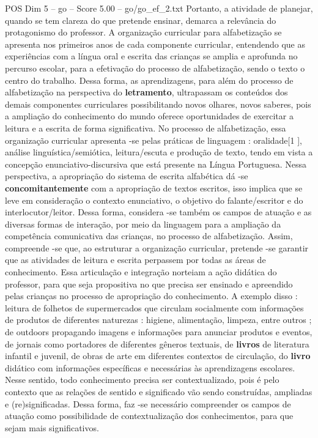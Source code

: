 \begin{textsample}{POS Dim 5 – go – Score 5.00 – go/go\_ef\_2.txt}
Portanto, a atividade de planejar, quando se tem clareza do que pretende ensinar, demarca a relevância do protagonismo do professor.
A organização curricular para alfabetização se apresenta nos primeiros anos de cada componente curricular, entendendo que as experiências com a língua oral e escrita das crianças se amplia e aprofunda no percurso escolar, para a efetivação do processo de alfabetização, sendo o texto o centro do trabalho.
Dessa forma, as aprendizagens, para além do processo de alfabetização na perspectiva do \textbf{letramento}, ultrapassam os conteúdos dos demais componentes curriculares possibilitando novos olhares, novos saberes, pois a ampliação do conhecimento do mundo oferece oportunidades de exercitar a leitura e a escrita de forma significativa.
No processo de alfabetização, essa organização curricular apresenta -se pelas práticas de linguagem : oralidade[1 ], análise linguística/semiótica, leitura/escuta e produção de texto, tendo em vista a concepção enunciativo-discursiva que está presente na Língua Portuguesa.
Nessa perspectiva, a apropriação do sistema de escrita alfabética dá -se \textbf{concomitantemente} com a apropriação de textos escritos, isso implica que se leve em consideração o contexto enunciativo, o objetivo do falante/escritor e do interlocutor/leitor.
Dessa forma, considera -se também os campos de atuação e as diversas formas de interação, por meio da linguagem para a ampliação da competência comunicativa das crianças, no processo de alfabetização.
Assim, compreende -se que, ao estruturar a organização curricular, pretende -se garantir que as atividades de leitura e escrita perpassem por todas as áreas de conhecimento.
Essa articulação e integração norteiam a ação didática do professor, para que seja propositiva no que precisa ser ensinado e apreendido pelas crianças no processo de apropriação do conhecimento.
A exemplo disso : leitura de folhetos de supermercados que circulam socialmente com informações de produtos de diferentes naturezas : higiene, alimentação, limpeza, entre outros ; de outdoors propagando imagens e informações para anunciar produtos e eventos, de jornais como portadores de diferentes gêneros textuais, de \textbf{livros} de literatura infantil e juvenil, de obras de arte em diferentes contextos de circulação, do \textbf{livro} didático com informações específicas e necessárias às aprendizagens escolares.
Nesse sentido, todo conhecimento precisa ser contextualizado, pois é pelo contexto que as relações de sentido e significado vão sendo construídas, ampliadas e (re)significadas.
Dessa forma, faz -se necessário compreender os campos de atuação como possibilidade de contextualização dos conhecimentos, para que sejam mais significativos.

\end{textsample}
